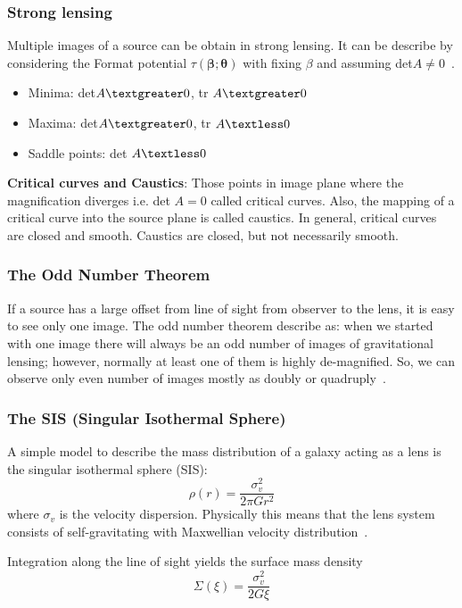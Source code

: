\subsubsection{Strong lensing}
Multiple images of a source can be obtain in strong lensing. It can be  describe by considering the Format potential $\tau(\pmb\beta;\pmb\theta) $ with fixing $\beta$ and assuming det$ A \ne 0$~\cite{manual}.

\begin{itemize}
	\item Minima: det$ A\textgreater 0$, tr $A\textgreater 0$
	\item Maxima: det$ A\textgreater 0$, tr $A\textless 0$
	\item Saddle points: det $A\textless 0$
\end{itemize}
\noindent
\textbf{Critical curves and Caustics}: Those points in image plane where the magnification diverges i.e. det $A=0  $ called critical curves. Also, the mapping of a critical curve into the source plane is called caustics. In general, critical curves are closed and smooth. Caustics are closed, but not necessarily smooth.

\subsubsection{The Odd Number Theorem}
If a source has a large offset from line of sight from observer to the lens, it is easy to see only one image. The odd number theorem describe as: when we started with one image there will always be an odd number of images of gravitational lensing; however, normally at least one of them is highly de-magnified. So, we can observe only even number of images mostly as doubly or quadruply~\cite{manual}.


\subsubsection{The SIS (Singular Isothermal Sphere)}
A simple model to describe the mass distribution of a galaxy acting as a lens is the singular isothermal sphere (SIS):
\begin{equation}
\rho(r)=\frac{\sigma_{v}^{2}}{2\pi G r^2}
\label{equ:SIS}
\end{equation}
where $ \sigma_{v} $ is the velocity dispersion. Physically this means that the lens system consists of self-gravitating with Maxwellian velocity distribution~\cite{Schneider}.

Integration along the line of sight yields the surface mass density
\begin{equation}
\Sigma(\xi)=\frac{\sigma^2_{v}}{2G\xi}
\label{equ:Sigma(xi)}
\end{equation}

